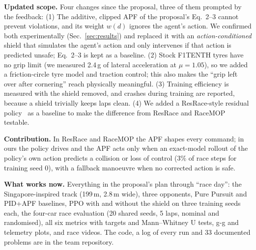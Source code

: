 \documentclass[conference]{IEEEtran}
\begin{document}
\textbf{Updated scope.} Four changes since the proposal, three of them prompted by the feedback:
(1) The additive, clipped APF of the proposal's Eq.~2--3 cannot prevent violations, and its weight $w(d)$ ignores
the agent's action. We confirmed both experimentally (Sec.~\ref{sec:results}) and replaced it with an
\emph{action-conditioned} shield that simulates the agent's action and only intervenes if that action is predicted
unsafe; Eq.~2--3 is kept as a baseline. (2) Stock F1TENTH tyres have no grip limit (we measured 2.4\,g of lateral
acceleration at $\mu = 1.05$), so we added a friction-circle tyre model and traction control; this also makes the
``grip left over after cornering'' reach physically meaningful. (3) Training efficiency is measured with the shield
removed, and crashes during training are reported, because a shield trivially keeps laps clean. (4) We added a
ResRace-style residual policy~\cite{zhang2022} as a baseline to make the difference from ResRace and
RaceMOP~\cite{trumpp2024} testable.

\textbf{Contribution.} In ResRace and RaceMOP the APF shapes every command; in ours the policy drives and the APF
acts only when an exact-model rollout of the policy's own action predicts a collision or loss of control (3\% of
race steps for training seed 0), with a fallback manoeuvre when no corrected action is safe.

\textbf{What works now.} Everything in the proposal's plan through ``race day'': the Singapore-inspired track
(199\,m, 2.8\,m wide), three opponents, Pure Pursuit and PID+APF baselines, PPO with and without the shield on
three training seeds each, the four-car race evaluation (20 shared seeds, 5 laps, nominal and randomised), all six
metrics with targets and Mann--Whitney U tests, g-g and telemetry plots, and race videos. The code, a log of every
run and 33 documented problems are in the team repository.
\end{document}
